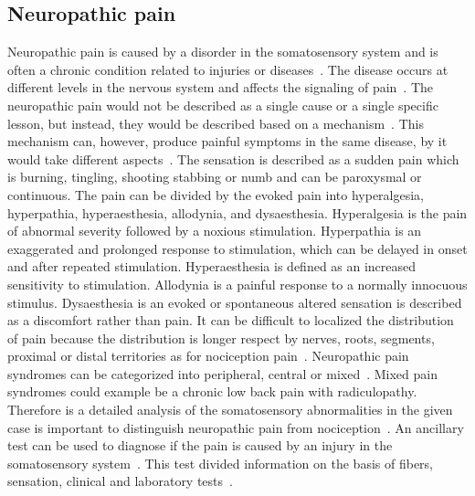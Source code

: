 \subsection{Neuropathic pain}
Neuropathic pain is caused by a disorder in the somatosensory system and is often a chronic condition related to injuries or diseases~\cite{Mindruta2013}. The disease occurs at different levels in the nervous system and affects the signaling of pain~\cite{Mindruta2013}. The neuropathic pain would not be described as a single cause or a single specific lesson, but instead, they would be described based on a mechanism~\cite{Mindruta2013}. This mechanism can, however, produce painful symptoms in the same disease, by it would take different aspects~\cite{Mindruta2013}.
The sensation is described as a sudden pain which is burning, tingling, shooting stabbing or numb and can be paroxysmal or continuous. The pain can be divided by the evoked pain into hyperalgesia, hyperpathia, hyperaesthesia, allodynia, and dysaesthesia. Hyperalgesia is the pain of abnormal severity followed by a noxious stimulation. Hyperpathia is an exaggerated and prolonged response to stimulation, which can be delayed in onset and after repeated stimulation. Hyperaesthesia is defined as an increased sensitivity to stimulation. Allodynia is a painful response to a normally innocuous stimulus. Dysaesthesia is an evoked or spontaneous altered sensation is described as a discomfort rather than pain. 
It can be difficult to localized the distribution of pain because the distribution is longer respect by nerves, roots, segments, proximal or distal territories as for nociception pain~\cite{Mindruta2013}. 
Neuropathic pain syndromes can be categorized into peripheral, central or mixed~\cite{Mindruta2013}. Mixed pain syndromes could example be a chronic low back pain with radiculopathy. Therefore is a detailed analysis of the somatosensory abnormalities in the given case is important to distinguish neuropathic pain from nociception~\cite{Mindruta2013}. An ancillary test can be used to diagnose if the pain is caused by an injury in the somatosensory system~\cite{Mindruta2013}. This test divided information on the basis of fibers, sensation, clinical and laboratory tests~\cite{Mindruta2013}. 